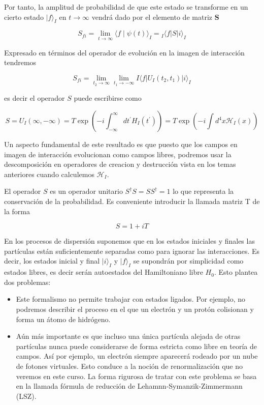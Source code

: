 Por tanto, la amplitud de probabilidad de que este estado se transforme en un cierto estado $|f\rangle_{I}$ en $t \rightarrow \infty$ vendrá dado por el elemento de matriz $\mathbf{S}$

\begin{equation*}
S_{f i}=\lim _{t \rightarrow \infty}\langle f \mid \psi(t)\rangle_{I}={ }_{I}\langle f| S|i\rangle_{I} \tag{7.13}
\end{equation*}


Expresado en términos del operador de evolución en la imagen de interacción tendremos

\begin{equation*}
S_{f i}=\lim _{t_{2} \rightarrow \infty} \lim _{t_{1} \rightarrow-\infty} I\langle f| U_{I}\left(t_{2}, t_{1}\right)|i\rangle_{I} \tag{7.14}
\end{equation*}

es decir el operador $S$ puede escribirse como

\begin{equation*}
S=U_{I}(\infty,-\infty)=T \exp \left(-i \int_{-\infty}^{\infty} d t^{\prime} H_{I}\left(t^{\prime}\right)\right)=T \exp \left(-i \int d^{4} x \mathscr{H}_{I}(x)\right) \tag{7.15}
\end{equation*}


Un aspecto fundamental de este resultado es que puesto que los campos en imagen de interacción evolucionan como campos libres, podremos usar la descomposición en operadores de creacion y destrucción vista en los temas anteriores cuando calculemos $\mathscr{H}_{I}$.

El operador $S$ es un operador unitario $S^{\dagger} S=S S^{\dagger}=1$ lo que representa la conservación de la probabilidad. Es conveniente introducir la llamada matriz T de la forma

\begin{equation*}
S=1+i T \tag{7.16}
\end{equation*}


En los procesos de dispersión suponemos que en los estados iniciales y finales las partículas están suficientemente separadas como para ignorar las interacciones. Es decir, los estados inicial y final $|i\rangle_{I}$ y $|f\rangle_{I}$ se supondrán por simplicidad como estados libres, es decir serán autoestados del Hamiltoniano libre $H_{0}$. Esto plantea dos problemas:
\begin{itemize}
  \item Este formalismo no permite trabajar con estados ligados. Por ejemplo, no podremos describir el proceso en el que un electrón y un protón colisionan y forma un átomo de hidrógeno.
  \item Aún más importante es que incluso una única partícula alejada de otras partículas nunca puede considerarse de forma estricta como libre en teoría de campos. Así por ejemplo, un electrón siempre aparecerá rodeado por un nube de fotones virtuales. Esto conduce a la noción de renormalización que no veremos en este curso. La forma rigurosa de tratar con este problema se basa en la llamada fórmula de reducción de Lehamnn-Symanzik-Zimmermann (LSZ).
\end{itemize}


